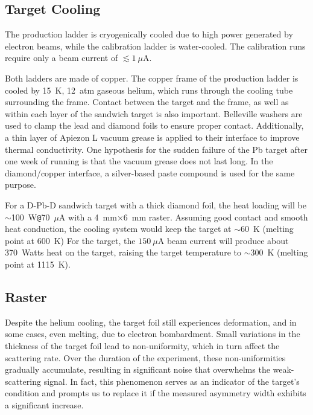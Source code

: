 \subsection{Target Cooling}
The production ladder is cryogenically cooled due to high power generated by electron beams,
while the calibration ladder is water-cooled. The calibration runs require only
a beam current of $\lesssim 1\ \mu$A. 

Both ladders are made of copper. The copper frame of the production ladder is cooled 
by 15~K, 12~atm gaseous helium, which runs through the cooling tube surrounding the frame.
Contact between the target and the frame, as well as within each layer of the \Pb sandwich
target is also important. Belleville washers are used to clamp the lead and 
diamond foils to ensure proper contact. Additionally, a thin layer of Apiezon L vacuum grease 
is applied to their interface to improve thermal conductivity. 
One hypothesis for the sudden failure of the Pb target after one week of running 
is that the vacuum grease does not last long.
In the diamond/copper interface, a silver-based paste compound is used for the same purpose.

For a D-Pb-D sandwich target with a thick diamond foil, the heat loading will be $\sim$100~W\texttt{@}70~$\mu$A
with a 4~mm$\times$6~mm raster. Assuming good contact and smooth heat conduction,
the cooling system would keep the \Pb target at $\sim60$~K (melting point at $600$~K) 
For the \Ca target, the $150\ \mu$A beam current will produce 
about 370~Watts heat on the target, raising the target temperature to $\sim300$~K (melting point at 1115~K).


\subsection{Raster}
Despite the helium cooling, the target foil still experiences deformation, and in some cases, even melting, due to electron bombardment. Small variations in the thickness of the target foil lead to non-uniformity, which in turn affect the scattering rate. Over the duration of the experiment, these non-uniformities gradually accumulate, resulting in significant noise that overwhelms the weak-scattering signal. In fact, this phenomenon serves as an indicator of the target's condition and prompts us to replace it if the measured asymmetry width exhibits a significant increase.

